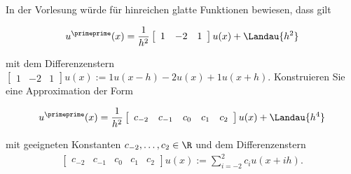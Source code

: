 \begin{exercise}
  In der Vorlesung würde für hinreichen glatte Funktionen bewiesen, dass gilt

  \begin{align*}
    u^\primeprime (x) = \frac{1}{h^2}\left[
    \begin{array}{ccc}
      1 & -2 & 1
    \end{array}
    \right] u(x) +
    \Landau{h^2}
  \end{align*}

  mit dem Differenzenstern $\left[
  \begin{array}{ccc}
    1 & -2 & 1
  \end{array}
  \right]u(x):= 1u(x-h)-2u(x)+1u(x+h)$.
  Konstruieren Sie eine Approximation der Form

  \begin{align*}
    u^\primeprime (x) = \frac{1}{h^2} \left[
    \begin{array}{ccccc}
    c_{-2} & c_{-1} & c_0 & c_1 & c_ 2
    \end{array}
    \right]
    u(x) + \Landau{h^4}
  \end{align*}

  mit geeigneten Konstanten $c_{-2}, \dots , c_2 \in \R$ und dem Differenzenstern
  \begin{align*}
    \left[
    \begin{array}{ccccc}
        c_{-2} & c_{-1} & c_0 & c_1 & c_ 2
    \end{array}
    \right]
    u(x)
    :=
    \sum_{i=-2}^2 c_i u(x+ih).
  \end{align*}
\end{exercise}

